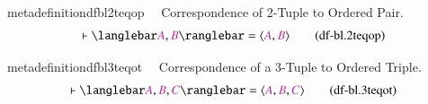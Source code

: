 \begin{restatable}{metadefinition}{dfbl2teqop}~~ Correspondence of 2-Tuple to
Ordered Pair.
\begin{align}
\vdash \langlebar \mc{A} , \mc{B} \ranglebar = \langle \mc{A} , \mc{B}
    \rangle\label{eq:df-bl.2teqop}\tag{df-bl.2teqop}
\end{align}
\end{restatable}

\begin{restatable}{metadefinition}{dfbl3teqot}~~ Correspondence of a 3-Tuple to
Ordered Triple.
\begin{align}
\vdash \langlebar \mc{A} , \mc{B} , \mc{C} \ranglebar = \langle \mc{A} , \mc{B}
    , \mc{C} \rangle\label{eq:df-bl.3teqot}\tag{df-bl.3teqot}
\end{align}
\end{restatable}

